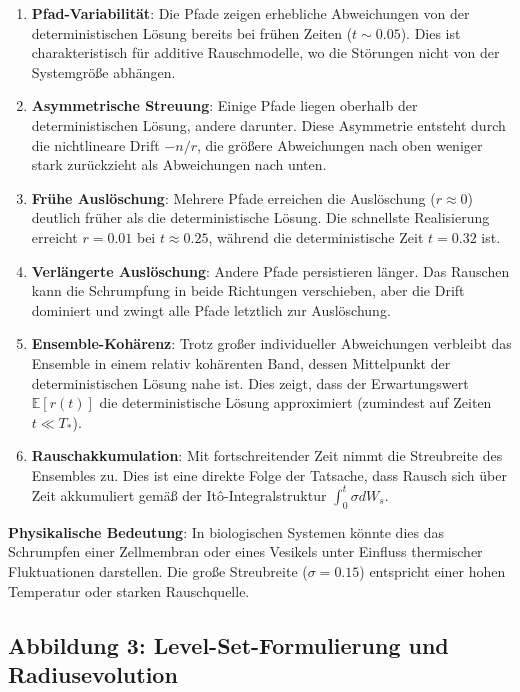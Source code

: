 \documentclass[a4paper,12pt]{article}
\theoremstyle{definition}
\begin{document}
\begin{enumerate}
	\item \textbf{Pfad-Variabilität}: Die Pfade zeigen erhebliche Abweichungen von der deterministischen Lösung bereits bei frühen Zeiten ($t \sim 0.05$). Dies ist charakteristisch für additive Rauschmodelle, wo die Störungen nicht von der Systemgröße abhängen.
	
	\item \textbf{Asymmetrische Streuung}: Einige Pfade liegen oberhalb der deterministischen Lösung, andere darunter. Diese Asymmetrie entsteht durch die nichtlineare Drift $-n/r$, die größere Abweichungen nach oben weniger stark zurückzieht als Abweichungen nach unten.
	
	\item \textbf{Frühe Auslöschung}: Mehrere Pfade erreichen die Auslöschung ($r \approx 0$) deutlich früher als die deterministische Lösung. Die schnellste Realisierung erreicht $r = 0.01$ bei $t \approx 0.25$, während die deterministische Zeit $t = 0.32$ ist.
	
	\item \textbf{Verlängerte Auslöschung}: Andere Pfade persistieren länger. Das Rauschen kann die Schrumpfung in beide Richtungen verschieben, aber die Drift dominiert und zwingt alle Pfade letztlich zur Auslöschung.
	
	\item \textbf{Ensemble-Kohärenz}: Trotz großer individueller Abweichungen verbleibt das Ensemble in einem relativ kohärenten Band, dessen Mittelpunkt der deterministischen Lösung nahe ist. Dies zeigt, dass der Erwartungswert $\mathbb{E}[r(t)]$ die deterministische Lösung approximiert (zumindest auf Zeiten $t \ll T_*$).
	
	\item \textbf{Rauschakkumulation}: Mit fortschreitender Zeit nimmt die Streubreite des Ensembles zu. Dies ist eine direkte Folge der Tatsache, dass Rausch sich über Zeit akkumuliert gemäß der Itô-Integralstruktur $\int_0^t \sigma dW_s$.
\end{enumerate}

\textbf{Physikalische Bedeutung}: In biologischen Systemen könnte dies das Schrumpfen einer Zellmembran oder eines Vesikels unter Einfluss thermischer Fluktuationen darstellen. Die große Streubreite ($\sigma = 0.15$) entspricht einer hohen Temperatur oder starken Rauschquelle.

\subsection{Abbildung 3: Level-Set-Formulierung und Radiusevolution}
\end{document}

